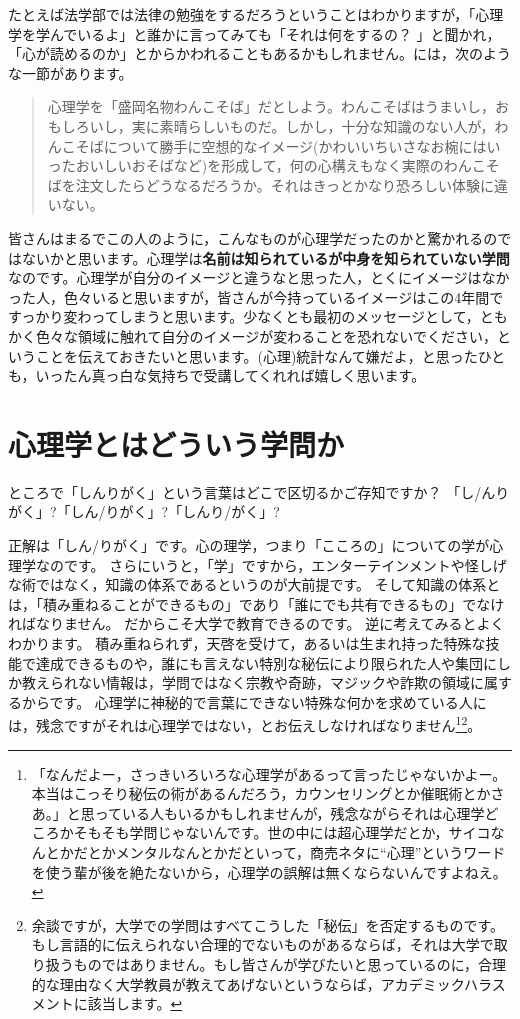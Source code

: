 \documentclass{ltjsbook}
\begin{document}
たとえば法学部では法律の勉強をするだろうということはわかりますが，「心理学を学んでいるよ」と誰かに言ってみても「それは何をするの？ 」と聞かれ，「心が読めるのか」とからかわれることもあるかもしれません。\textcite{Michimata200903}には，次のような一節があります。

\begin{quote}
	心理学を「盛岡名物わんこそば」だとしよう。わんこそばはうまいし，おもしろいし，実に素晴らしいものだ。しかし，十分な知識のない人が，わんこそばについて勝手に空想的なイメージ(かわいいちいさなお椀にはいったおいしいおそばなど)を形成して，何の心構えもなく実際のわんこそばを注文したらどうなるだろうか。それはきっとかなり恐ろしい体験に違いない。
\end{quote}

皆さんはまるでこの人のように，こんなものが心理学だったのかと驚かれるのではないかと思います。心理学は\textbf{名前は知られているが中身を知られていない学問}なのです。心理学が自分のイメージと違うなと思った人，とくにイメージはなかった人，色々いると思いますが，皆さんが今持っているイメージはこの4年間ですっかり変わってしまうと思います。少なくとも最初のメッセージとして，ともかく色々な領域に触れて自分のイメージが変わることを恐れないでください，ということを伝えておきたいと思います。(心理)統計なんて嫌だよ，と思ったひとも，いったん真っ白な気持ちで受講してくれれば嬉しく思います。

\section{心理学とはどういう学問か}

ところで「しんりがく」という言葉はどこで区切るかご存知ですか？ 「し/んりがく」?「しん/りがく」?「しんり/がく」?

正解は「しん/りがく」です。心の理学，つまり「こころの」についての学が心理学なのです。
さらにいうと，「学」ですから，エンターテインメントや怪しげな術ではなく，知識の体系であるというのが大前提です。
そして知識の体系とは，「積み重ねることができるもの」であり「誰にでも共有できるもの」でなければなりません。
だからこそ大学で教育できるのです。
逆に考えてみるとよくわかります。
積み重ねられず，天啓を受けて，あるいは生まれ持った特殊な技能で達成できるものや，誰にも言えない特別な秘伝により限られた人や集団にしか教えられない情報は，学問ではなく宗教や奇跡，マジックや詐欺の領域に属するからです。
心理学に神秘的で言葉にできない特殊な何かを求めている人には，残念ですがそれは心理学ではない，とお伝えしなければなりません\footnote{「なんだよー，さっきいろいろな心理学があるって言ったじゃないかよー。本当はこっそり秘伝の術があるんだろう，カウンセリングとか催眠術とかさあ。」と思っている人もいるかもしれませんが，残念ながらそれは心理学どころかそもそも学問じゃないんです。世の中には超心理学だとか，サイコなんとかだとかメンタルなんとかだといって，商売ネタに``心理''というワードを使う輩が後を絶たないから，心理学の誤解は無くならないんですよねえ。}\footnote{余談ですが，大学での学問はすべてこうした「秘伝」を否定するものです。もし言語的に伝えられない合理的でないものがあるならば，それは大学で取り扱うものではありません。もし皆さんが学びたいと思っているのに，合理的な理由なく大学教員が教えてあげないというならば，アカデミックハラスメントに該当します。}。
\end{document}
